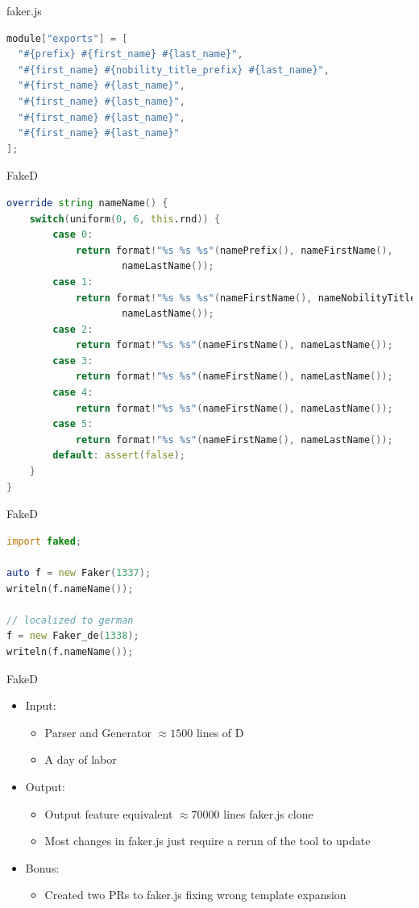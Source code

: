 \documentclass[aspectratio=169,notes]{beamer}
\begin{document}
	\begin{frame}[fragile]{faker.js}
		\begin{lstlisting}[language=Java,caption={locales/de/name/name.js}]
module["exports"] = [
  "#{prefix} #{first_name} #{last_name}",
  "#{first_name} #{nobility_title_prefix} #{last_name}",
  "#{first_name} #{last_name}",
  "#{first_name} #{last_name}",
  "#{first_name} #{last_name}",
  "#{first_name} #{last_name}"
];\end{lstlisting}
	\end{frame}

	\begin{frame}[fragile]{FakeD \hfill\cite{faked}}
\begin{lstlisting}[language=D,basicstyle=\scriptsize\ttfamily]
override string nameName() {
	switch(uniform(0, 6, this.rnd)) {
		case 0:
			return format!"%s %s %s"(namePrefix(), nameFirstName(), 
					nameLastName());
		case 1:
			return format!"%s %s %s"(nameFirstName(), nameNobilityTitlePrefix(), 
					nameLastName());
		case 2:
			return format!"%s %s"(nameFirstName(), nameLastName());
		case 3:
			return format!"%s %s"(nameFirstName(), nameLastName());
		case 4:
			return format!"%s %s"(nameFirstName(), nameLastName());
		case 5:
			return format!"%s %s"(nameFirstName(), nameLastName());
		default: assert(false);
	}
}
\end{lstlisting}
	\end{frame}

	\begin{frame}[fragile]{FakeD}
\begin{lstlisting}[language=D]
import faked;

auto f = new Faker(1337);
writeln(f.nameName());

// localized to german
f = new Faker_de(1338);
writeln(f.nameName());
\end{lstlisting}
	\end{frame}

	\begin{frame}[fragile]{FakeD}
		\Large
		\begin{itemize}
			\item Input:
			\begin{itemize}
				\large
				\item Parser and Generator $\approx 1500$ lines of D
				\item A day of labor
			\end{itemize}
		\pause
			\item Output:
			\begin{itemize}
				\large
				\item Output feature equivalent $\approx 70000$ lines faker.js clone
				\item Most changes in faker.js just require a rerun of the tool to update
			\end{itemize}
		\pause
			\item Bonus:
			\begin{itemize}
				\large
				\item Created two PRs to faker.js fixing wrong template expansion	
			\end{itemize}
		\end{itemize}
	\end{frame}
\end{document}
